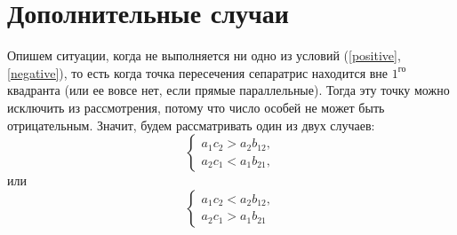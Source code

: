 \documentclass[12pt,a4paper]{article}
\begin{document}
    \section{Дополнительные случаи}
    Опишем ситуации, когда не выполняется ни одно из условий (\ref{positive},\,\ref{negative}), то есть когда точка пересечения сепаратрис находится вне $1^{\text{го}}$ квадранта (или ее вовсе нет, если прямые параллельные). Тогда эту точку можно исключить из рассмотрения, потому что число особей не может быть отрицательным. Значит, будем рассматривать один из двух случаев:
    \begin{equation}
        \label{posneg}
        \begin{cases}
            a_1 c_2 > a_2 b_{12},
            \\
            a_2 c_1 < a_1 b_{21},
        \end{cases}
    \end{equation}
    \noindent или
    \begin{equation}
        \label{negpos}
        \begin{cases}
            a_1 c_2 < a_2 b_{12},
            \\
            a_2 c_1 > a_1 b_{21}
        \end{cases}
    \end{equation}
\end{document}
